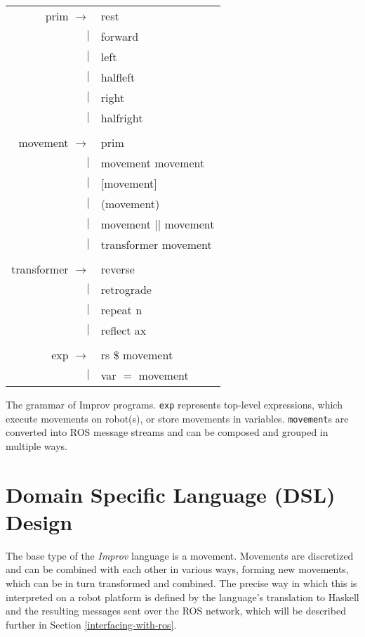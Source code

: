\documentclass[sigchi-a]{acmart}
\begin{document}
\begin{margintable}
\begin{tabular}{rl}
prim $\rightarrow$ & rest  \\
     $|$ & forward \\
     $|$ & left  \\
     $|$ & halfleft\\
     $|$ & right \\
     $|$ & halfright \\
\\
movement $\rightarrow$ & prim \\
         $|$ & movement movement \\
         $|$ & [movement] \\
         $|$ & (movement) \\
         $|$ & movement $||$ movement  \\
         $|$ & transformer movement \\
\\
transformer $\rightarrow$ & reverse \\
  $|$ & retrograde \\
  $|$ & repeat n \\
  $|$ & reflect ax \\
\\
exp $\rightarrow$ & rs \$ movement \\
    $|$ & var $=$ movement
\end{tabular}

\caption{The grammar of Improv programs. \texttt{exp} represents top-level
expressions, which execute movements on robot(s), or store movements in
variables. \texttt{movement}s are converted into ROS message streams and can be
composed and grouped in multiple ways. \label{grammar}}
\end{margintable}


\section{Domain Specific Language (DSL)
Design}\label{domain-specific-language-design}


The base type of the \emph{Improv} language is a movement. Movements are
discretized and can be combined with each other in various ways, forming new
movements, which can be in turn transformed and combined. The precise way in
which this is interpreted on a robot platform is defined by the language's
translation to Haskell and the resulting messages sent over the ROS network,
which will be described further in Section \ref{interfacing-with-ros}.
\end{document}
